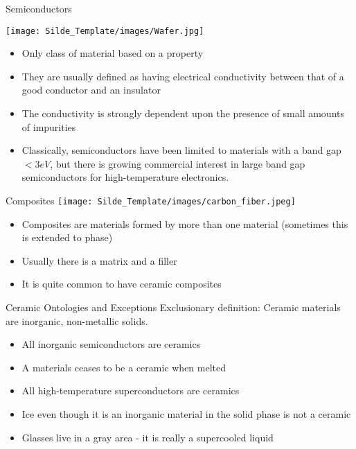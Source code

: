 \documentclass{libs/XJTLU_format}
\begin{document}
\begin{frame}{Semiconductors}

\centering
\texttt{[image: Silde\_Template/images/Wafer.jpg]}

\begin{itemize}
    \item Only class of material based on a property
    \pause
    \item They are usually defined as having electrical conductivity between that of a good conductor and an insulator
    \pause
    \item The conductivity is strongly dependent upon the presence of small amounts of impurities
    \pause
    \item Classically, semiconductors have been limited to materials with a band gap $<3eV$, but there is growing commercial interest in large band gap semiconductors for high-temperature electronics.
\end{itemize}
    
\end{frame}

\begin{frame}{Composites}
    \centering
    \texttt{[image: Silde\_Template/images/carbon\_fiber.jpeg]}

    \begin{itemize}
        \item Composites are materials formed by more than one material (sometimes this is extended to phase)
        \pause
        \item Usually there is a matrix and a filler
        \pause
        \item It is quite common to have ceramic composites
    \end{itemize}
    
    
\end{frame}

\begin{frame}{Ceramic Ontologies and Exceptions}
Exclusionary definition: Ceramic materials are inorganic, non-metallic solids.
\pause

\begin{itemize}
    \item All inorganic semiconductors are ceramics
    \pause
    \item A materials ceases to be a ceramic when melted
    \pause
    \item All high-temperature superconductors are ceramics
    \pause
    \item Ice even though it is an inorganic material in the solid phase is not a ceramic
    \pause
    \item Glasses live in a gray area - it is really a supercooled liquid
\end{itemize}
    
\end{frame}
\end{document}
